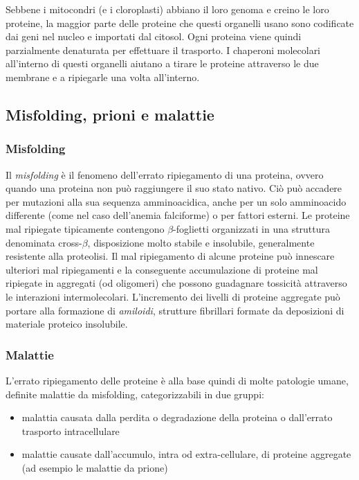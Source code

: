 {Sebbene i mitocondri (e i cloroplasti) abbiano il loro genoma e creino le loro proteine, la maggior parte delle proteine che questi organelli usano sono codificate dai geni nel nucleo e importati dal citosol. Ogni proteina viene quindi parzialmente denaturata per effettuare il trasporto. I chaperoni molecolari all'interno di questi organelli aiutano a tirare le proteine attraverso le due membrane e a ripiegarle una volta all'interno\supercite{alberts2018essential}.


\subsection{Misfolding, prioni e malattie}
{
	
\subsubsection{Misfolding}
Il \textit{misfolding} è il fenomeno dell'errato ripiegamento di una proteina, ovvero quando una proteina non può raggiungere il suo stato nativo. Ciò può accadere per mutazioni alla sua sequenza amminoacidica, anche per un solo amminoacido differente (come nel caso dell'anemia falciforme) o per fattori esterni. Le proteine mal ripiegate tipicamente contengono $\beta$-foglietti organizzati in una struttura denominata cross-$\beta$, disposizione molto stabile e insolubile, generalmente resistente alla proteolisi. Il mal ripiegamento di alcune proteine può innescare ulteriori mal ripiegamenti e la conseguente accumulazione di proteine mal ripiegate in aggregati (od oligomeri) che possono guadagnare tossicità attraverso le interazioni intermolecolari. L'incremento dei livelli di proteine aggregate può portare alla formazione di \textit{amiloidi}, strutture fibrillari formate da deposizioni di materiale proteico insolubile. 

\subsubsection{Malattie}
L'errato ripiegamento delle proteine è alla base quindi di molte patologie umane, definite malattie da misfolding, categorizzabili in due gruppi:

\begin{itemize}
	\item malattia causata dalla perdita o degradazione della proteina o dall'errato trasporto intracellulare
	\item malattie causate dall'accumulo, intra od extra-cellulare, di proteine aggregate (ad esempio le malattie da prione)
\end{itemize}

}}
